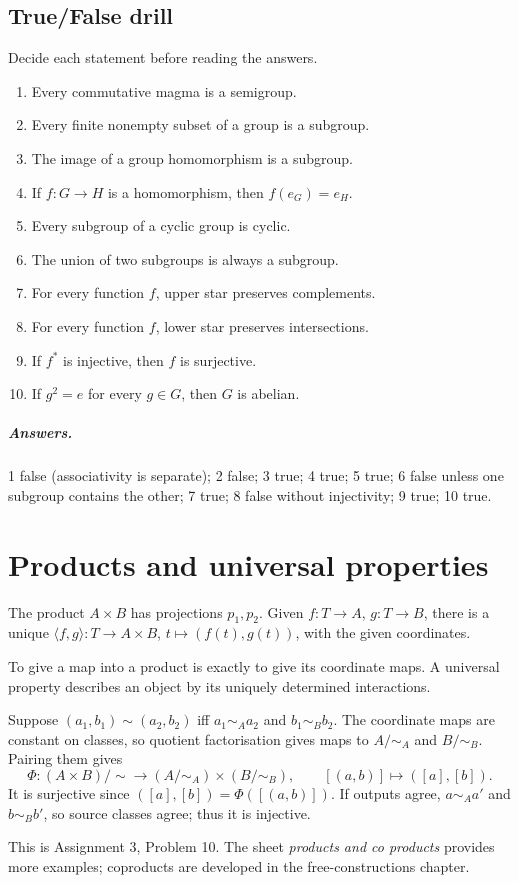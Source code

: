 \documentclass[11pt,openany]{book}
\theoremstyle{definition}
\begin{document}
\section{True/False drill}
Decide each statement before reading the answers.
\begin{enumerate}
\item Every commutative magma is a semigroup.
\item Every finite nonempty subset of a group is a subgroup.
\item The image of a group homomorphism is a subgroup.
\item If $f:G\to H$ is a homomorphism, then $f(e_G)=e_H$.
\item Every subgroup of a cyclic group is cyclic.
\item The union of two subgroups is always a subgroup.
\item For every function $f$, upper star preserves complements.
\item For every function $f$, lower star preserves intersections.
\item If $f^*$ is injective, then $f$ is surjective.
\item If $g^2=e$ for every $g\in G$, then $G$ is abelian.
\end{enumerate}
\paragraph{Answers.}
1 false (associativity is separate); 2 false; 3 true; 4 true; 5 true; 6 false unless one subgroup contains the other; 7 true; 8 false without injectivity; 9 true; 10 true.


\chapter{Products and universal properties}
The product $A\times B$ has projections $p_1,p_2$. Given $f:T\to A$, $g:T\to B$, there is a unique
$\langle f,g\rangle:T\to A\times B$, $t\mapsto(f(t),g(t))$, with the given coordinates.
\begin{intuition}To give a map into a product is exactly to give its coordinate maps. A universal property describes an object by its uniquely determined interactions.\end{intuition}

Suppose $(a_1,b_1)\sim(a_2,b_2)$ iff $a_1\sim_Aa_2$ and $b_1\sim_Bb_2$. The coordinate maps are constant on classes, so quotient factorisation gives maps to $A/{\sim_A}$ and $B/{\sim_B}$. Pairing them gives
\[
\Phi:(A\times B)/{\sim}\longrightarrow(A/{\sim_A})\times(B/{\sim_B}),
\qquad [(a,b)]\mapsto([a],[b]).
\]
It is surjective since $([a],[b])=\Phi([(a,b)])$. If outputs agree, $a\sim_Aa'$ and $b\sim_Bb'$, so source classes agree; thus it is injective.
\begin{assignmentlink}This is Assignment 3, Problem 10. The sheet \emph{products and co products} provides more examples; coproducts are developed in the free-constructions chapter.\end{assignmentlink}
\end{document}

